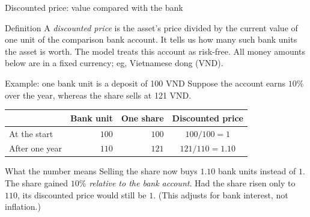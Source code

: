 \documentclass{beamer}
\begin{document}
\begin{frame}[shrink=5]{Discounted price: value compared with the bank}
\small
\begin{block}{Definition}
A \emph{discounted price} is the asset's price divided by the current
value of one unit of the comparison bank account.
It tells us how many such bank units the asset is worth.
The model treats this account as risk-free.  All money amounts below are in a fixed currency; eg, Vietnamese dong (VND).
\end{block}
\begin{exampleblock}{Example: one bank unit is a deposit of 100 VND}
Suppose the account earns $10\%$ over the year, whereas the share sells at 121 VND.
\par\medskip
\centering
\renewcommand{\arraystretch}{1.5}
\begin{tabular}{@{}lrrc@{}}
 & Bank unit & One share & Discounted price\\\hline
At the start & $100$ & $100$ & $100/100=1$\\
After one year & $110$ & $121$ & $121/110=1.10$
\end{tabular}
\end{exampleblock}
\begin{alertblock}{What the number means}
Selling the share now buys $1.10$ bank units instead of $1$.
The share gained $10\%$ \emph{relative to the bank account}.
Had the share risen only to $110$, its discounted price would still be $1$.
(This adjusts for bank interest, not inflation.)
\end{alertblock}
\end{frame}

\end{document}
